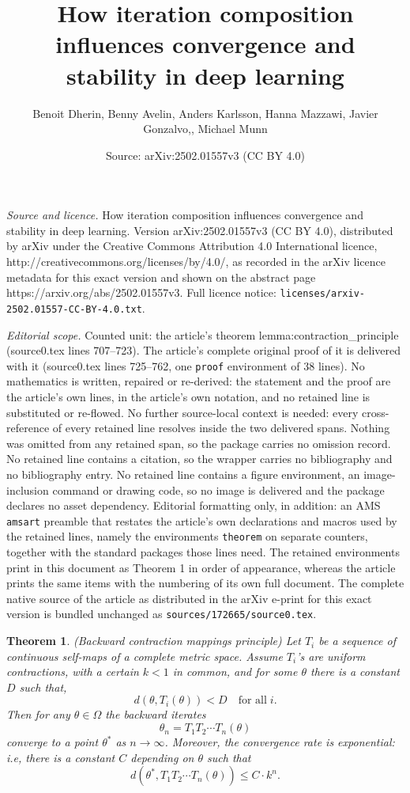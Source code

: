\documentclass[10pt,a4paper]{amsart}
\title{How iteration composition influences convergence and stability in deep learning}
\author{Benoit Dherin, Benny Avelin, Anders Karlsson, Hanna Mazzawi, Javier Gonzalvo,, Michael Munn}
\date{Source: arXiv:2502.01557v3 (CC BY 4.0)}
\newtheorem{theorem}{Theorem}
\begin{document}
\maketitle

\noindent\emph{Source and licence.} How iteration composition influences convergence and stability in deep learning. Version arXiv:2502.01557v3 (CC BY 4.0), distributed by arXiv under the Creative Commons Attribution 4.0 International licence, http://creativecommons.org/licenses/by/4.0/, as recorded in the arXiv licence metadata for this exact version and shown on the abstract page https://arxiv.org/abs/2502.01557v3. Full licence notice: \texttt{licenses/arxiv-2502.01557-CC-BY-4.0.txt}.\par\smallskip

\noindent\textit{Editorial scope.} Counted unit: the article's theorem lemma:contraction\_principle (source0.tex lines 707--723). The article's complete original proof of it is delivered with it (source0.tex lines 725--762, one \texttt{proof} environment of 38 lines). No mathematics is written, repaired or re-derived: the statement and the proof are the article's own lines, in the article's own notation, and no retained line is substituted or re-flowed.  No further source-local context is needed: every cross-reference of every retained line resolves inside the two delivered spans.  Nothing was omitted from any retained span, so the package carries no omission record.  No retained line contains a citation, so the wrapper carries no bibliography and no bibliography entry.  No retained line contains a figure environment, an image-inclusion command or drawing code, so no image is delivered and the package declares no asset dependency.  Editorial formatting only, in addition: an AMS \texttt{amsart} preamble that restates the article's own declarations and macros used by the retained lines, namely the environments \texttt{theorem} on separate counters, together with the standard packages those lines need.  The retained environments print in this document as Theorem 1 in order of appearance, whereas the article prints the same items with the numbering of its own full document.  The complete native source of the article as distributed in the arXiv e-print for this exact version is bundled unchanged as \texttt{sources/172665/source0.tex}.
\begin{theorem}\label{lemma:contraction_principle}
    (Backward contraction mappings principle) Let $T_{i}$ be a sequence of continuous self-maps of a complete metric space.
    Assume 
    $T_i$'s are uniform
    contractions, with a certain $k<1$ in common, and for some $\theta$ there is a constant $D$ such that,
    \begin{equation}\label{condition:boundedness}
        d(\theta,T_{i}(\theta))<D\quad \textrm{for all} \; i.
    \end{equation}
    Then for any $\theta \in \Omega$ the backward iterates 
    \[
    \theta_n = T_{1} T_{2}\cdots T_{n}(\theta)
    \]
    converge to a point $\theta^*$ as $n\rightarrow \infty$. Moreover, the convergence rate is exponential: i.e,  there is a constant $C$ depending on $\theta$ such that 
    \[
    d(\theta^*, T_{1} T_{2}\cdots T_{n}(\theta))\leq C\cdot k^{n}.
    \]
\end{theorem}
\end{document}
